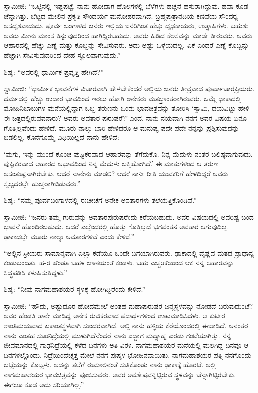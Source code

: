  ಸ್ವಾಮೀಜಿ: “ಒಟ್ಟಿನಲ್ಲಿ ಇಷ್ಟಪಟ್ಟೆ. ನಾನು ಹೋದಾಗ ಹೊಲಗಳಲ್ಲಿ ಬೆಳೆಗಳು ಹಚ್ಚನೆ ಹಸುರಾಗಿದ್ದುವು. ಹವಾ ಕೂಡ ಚೆನ್ನಾಗಿತ್ತು. ಬೆಟ್ಟದ ಮೇಲಿನ ಪ್ರಕೃತಿ ಸೌಂದರ್ಯ ಮನೋಹರವಾಗಿದೆ. ಬ್ರಹ್ಮಪುತ್ರಾನದಿಯ ಕಣಿವೆಯ ಸೌಂದರ‍್ಯ ಅಸದೃಶವಾದುದು. ಪೂರ್ವ ಬಂಗಾಳಿದ ಜನರು ಇಲ್ಲಿಯ ಜನರಿಗಿಂತ ಹೆಚ್ಚು ದೃಢಕಾಯರು, ಉತ್ಸಾಹಿಗಳು. ಬಹುಶಃ ಅವರು ಮೀನು ಮಾಂಸ ತಿನ್ನುವುದರಿಂದ ಹಾಗಿದ್ದಿರಬಹುದು. ಅವರು ಹಿಡಿದ ಕೆಲಸವನ್ನು ಮಾಡೇ ತೀರುವರು. ಅವರು ಆಹಾರದಲ್ಲಿ ಹೆಚ್ಚು ಎಣ್ಣೆ ಮತ್ತು ಕೊಬ್ಬನ್ನು ಸೇವಿಸುವರು. ಅದು ಅಷ್ಟು ಒಳ್ಳೆಯದಲ್ಲ. ಏಕೆ ಎಂದರೆ ಎಣ್ಣೆ ಕೊಬ್ಬನ್ನು ಹೆಚ್ಚಾಗಿ ಸೇವಿಸುವುದರಿಂದ ದೇಹ ಸ್ಥೂಲವಾಗುವುದು.” 

 ಶಿಷ್ಯ: “ಅವರಲ್ಲಿ ಧಾರ್ಮಿಕ ಪ್ರವೃತ್ತಿ ಹೇಗಿದೆ?” 

 ಸ್ವಾಮೀಜಿ: “ಧಾರ್ಮಿಕ ಭಾವನೆಗಳ ವಿಚಾರವಾಗಿ ಹೇಳಬೇಕೆಂದರೆ ಅಲ್ಲಿಯ ಜನರು ತೀವ್ರವಾದ ಪೂರ್ವಾಚಾರಪ್ರಿಯರು. ಧರ್ಮದಲ್ಲಿ ಹೆಚ್ಚು ಉದಾರ ಭಾವದಿಂದ ಇರಲು ಹೋಗಿ ಅನೇಕರು ಮತಭ್ರಾಂತರಾಗಿರುವರು. ಒಮ್ಮೆ ಢಾಕಾದಲ್ಲಿ ಮೋಹಿನಿಬಾಬುಗಳ ಮನೆಯಲ್ಲಿದ್ದಾಗ ಒಬ್ಬ ತರುಣನು ಒಂದು ಭಾವಚಿತ್ರವನ್ನು ತೋರಿಸಿ ‘ಸ್ವಾಮಿ, ದಯವಿಟ್ಟು ಹೇಳಿ ಈ ಚಿತ್ರದಲ್ಲಿರುವವನಾರು? ಅವರು ಅವತಾರ ಪುರುಷರೆ?’ ಎಂದ. ನಾನು ನಯವಾಗಿ ನನಗೆ ಅವರ ವಿಷಯ ಏನೂ ಗೊತ್ತಿಲ್ಲವೆಂದು ಹೇಳಿದೆ. ಮೂರು ನಾಲ್ಕು ಬಾರಿ ಹೇಳಿದರೂ ಆ ಮನುಷ್ಯ ಪದೇ ಪದೇ ನನ್ನನ್ನು ಪ್ರಶ್ನಿಸುವುದನ್ನು ಬಿಡಲಿಲ್ಲ. ಕೊನೆಗೊಮ್ಮೆ ವಿಧಿಯಿಲ್ಲದೆ ನಾನು ಹೇಳಿದೆ: 

 ‘ಮಗು, ಇನ್ನು ಮುಂದೆ ಕೊಂಚ ಪುಷ್ಟಿಕರವಾದ ಆಹಾರವನ್ನು ತೆಗೆದುಕೊ. ನಿನ್ನ ಮೆದುಳು ನಂತರ ಬಲಿಷ್ಠವಾಗುವುದು. ಪುಷ್ಟಿಕರವಾದ ಆಹಾರದ ಅಭಾವದಿಂದ ನಿನ್ನ ಮೆದುಳು ಬತ್ತಿಹೋಗಿದೆ.’ ಈ ಮಾತುಗಳಿಂದ ಆ ತರುಣ ಅಸಂತುಷ್ಟನಾಗಿರಬೇಕು. ಆದರೆ ನಾನೇನು ಮಾಡಲಿ? ಆದರೆ ನಾನೀ ರೀತಿ ಯುವಕರಿಗೆ ಹೇಳದಿದ್ದರೆ ಅವರು ಸ್ವಲ್ಪದರಲ್ಲೇ ಹುಚ್ಚರಾಗಿಬಿಡುವರು.” 

 ಶಿಷ್ಯ: “ನಮ್ಮ ಪೂರ್ವಬಂಗಾಳದಲ್ಲಿ ಈಚೀಚೆಗೆ ಅನೇಕ ಅವತಾರಗಳು ತಲೆಯೆತ್ತಿಕೊಂಡಿವೆ.” 

 ಸ್ವಾಮೀಜಿ: “ಜನರು ತಮ್ಮ ಗುರುವನ್ನು ಅವತಾರಪುರುಷರೆಂದು ಕರೆಯಬಹುದು. ಅವರ ವಿಷಯದಲ್ಲಿ ಅವರಿಷ್ಟ ಬಂದ ಭಾವನೆ ಹೊಂದಿರಬಹುದು. ಆದರೆ ಎಲ್ಲೆಂದರಲ್ಲಿ ಹೊತ್ತು ಗೊತ್ತಿಲ್ಲದೆ ಭಗವಂತನ ಅವತಾರ ಆಗುವುದಿಲ್ಲ. ಢಾಕಾದಲ್ಲೇ ಮೂರು ನಾಲ್ಕು ಅವತಾರಗಳಿವೆ ಎಂದು ಕೇಳಿದೆ.” 

 “ಅಲ್ಲಿನ ಸ್ರೀಯರು ಸಾಮಾನ್ಯವಾಗಿ ಎಲ್ಲಾ ಕಡೆಯೂ ಒಂದೇ ಬಗೆಯಾಗಿರುವರು. ಢಾಕಾದಲ್ಲಿ ವೈಷ್ಣವ ಮತದ ಪ್ರಾಧಾನ್ಯ ಕಂಡುಬಂದಿತು. ಹ-ರ ಹೆಂಡತಿ ಬಹಳ ಜಾಣೆಯಂತೆ ಕಂಡಳು. ಬಹು ಎಚ್ಚರಿಕೆಯಿಂದ ಆಕೆ ನನ್ನ ಆಹಾರವನ್ನು ಸಿದ್ಧಪಡಿಸಿ ಕಳುಹಿಸುತ್ತಿದ್ದಳು.” 

 ಶಿಷ್ಯ: “ನೀವು ನಾಗಮಹಾಶಯರ ಸ್ಥಳಕ್ಕೆ ಹೋಗಿದ್ದಿರೆಂದು ಕೇಳಿದೆ.” 

 ಸ್ವಾಮೀಜಿ: “ಹೌದು, ಅಷ್ಟುದೂರ ಹೋದಮೇಲೆ ಅಂತಹ ಮಹಾಪುರುಷರ ಜನ್ಮಸ್ಥಳವನ್ನು ನೋಡದೆ ಬರುವುದುಂಟೆ? ಅವರ ಹೆಂಡತಿ ತಾನೇ ಮಾಡಿದ್ದ ಅನೇಕ ರುಚಿಕರವಾದ ಪದಾರ್ಥಗಳಿಂದ ಊಟಮಾಡಿಸಿದಳು. ಆ ಕುಟೀರ ಶಾಂತಿಮಯವಾದ ಏಕಾಂತಸ್ಥಳವಾಗಿ ಸುಂದರವಾಗಿದೆ. ಅಲ್ಲಿ ನಾನು ಹಳ್ಳಿಯ ಕೆರೆಯೊಂದರಲ್ಲಿ ಈಜಾಡಿದೆ. ಅನಂತರ ನಾನು ಎಂತಹ ಸುಖನಿದ್ರೆಯಲ್ಲಿ ಮುಳುಗಿದೆನೆಂದರೆ ನಾನು ಎದ್ದಾಗ ಮಧ್ಯಾಹ್ನ ಎರಡು ಗಂಟೆಯಾಗಿತ್ತು. ನನ್ನ ಜೀವಮಾನದಲ್ಲಿ ಗಾಢನಿದ್ರೆಯಲ್ಲಿ ಕಳೆದ ದಿನಗಳು ಅತಿ ವಿರಳ. ನಾಗಮಹಾಶಯರ ಮನೆಯಲ್ಲಿ ಮಲಗಿದ್ದ ದಿನವೂ ಆ ದಿನಗಳಲ್ಲೊಂದು. ನಿದ್ರೆಯಿಂದೆಚ್ಚೆತ್ತ ಮೇಲೆ ನನಗೆ ಪುಷ್ಕಳ ಭೋಜನವಾಯಿತು. ನಾಗಮಹಾಶಯರ ಪತ್ನಿ ನನಗೊಂದು ಬಟ್ಟೆಯನ್ನು ಕೊಟ್ಟಳು. ಅದನ್ನು ತಲೆಗೆ ರುಮಾಲಿನಂತೆ ಸುತ್ತಿಕೊಂಡು ನಾನು ಢಾಕಾಕ್ಕೆ ಹೊರಟೆ. ಅಲ್ಲಿ ನಾಗಮಹಾಶಯರ ಭಾವಚಿತ್ರವನ್ನು ಪೂಜಿಸುವರು. ಅವರ ಅವಶೇಷವನ್ನಿಟ್ಟಿರುವ ಸ್ಥಳವನ್ನು ಚೆನ್ನಾಗಿಟ್ಟಿರಬೇಕು. ಈಗಲೂ ಕೂಡ ಅದು ಸರಿಯಾಗಿಲ್ಲ.” 

